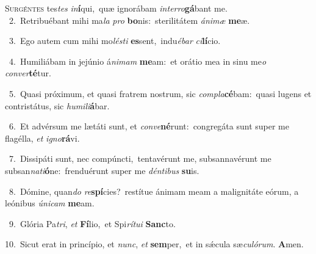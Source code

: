 \lettrine{\initial\textcolor{\initialcolor}{S}}{urgéntes} tes\textit{tes} \textit{in}\-\textbf{í}qui,~\star quæ ignorábam \textit{in}\-\textit{ter}\textit{ro}\textbf{gá}bant me.\\
{\numbfont\textcolor{\numbcolor}{~2.}}~Retribuébant mihi ma\textit{la} \textit{pro} \textbf{bo}\-nis:~\star sterilitátem \textit{á}\-\textit{ni}\textit{mæ} \textbf{me}\-æ.\par
{\numbfont\textcolor{\numbcolor}{~3.}}~Ego autem cum mihi mo\-\textit{lés}\-\textit{ti} \textbf{es}\-sent,~\star indu\-\textit{é}\-\textit{bar} \textit{ci}\-\textbf{lí}cio.\par
{\numbfont\textcolor{\numbcolor}{~4.}}~Humiliábam in jejúnio á\-\textit{ni}\-\textit{mam} \textbf{me}\-am:~\star et orátio mea in sinu me\textit{o} \textit{con}\-\textit{ver}\textbf{té}tur.\par
{\numbfont\textcolor{\numbcolor}{~5.}}~Quasi próximum, et quasi fratrem nostrum, sic \textit{com}\-\textit{pla}\textbf{cé}bam:~\star quasi lugens et contristátus, sic \textit{hu}\-\textit{mi}\textit{li}\textbf{á}bar.\par
{\numbfont\textcolor{\numbcolor}{~6.}}~Et advérsum me lætáti sunt, et \textit{con}\-\textit{ve}\textbf{né}runt:~\star congregáta sunt super me flagélla, \textit{et} \textit{i}\-\textit{gno}\textbf{rá}vi.\par
{\numbfont\textcolor{\numbcolor}{~7.}}~Dissipáti sunt, nec compúncti,~\dagger tentavérunt me, subsannavérunt me subsan\-\textit{na}\-\textit{ti}\textbf{ó}ne:~\star frenduérunt super me \textit{dén}\-\textit{ti}\textit{bus} \textbf{su}\-is.\par
{\numbfont\textcolor{\numbcolor}{~8.}}~Dómine, quan\textit{do} \textit{re}\-\textbf{spí}cies?~\star restítue ánimam meam a malignitáte eórum, a leónibus \textit{ú}\-\textit{ni}\textit{cam} \textbf{me}\-am.\par
{\numbfont\textcolor{\numbcolor}{~9.}}~Glória Pa\-\textit{tri}\-, \textit{et} \textbf{Fí}\-lio,~\star et Spi\-\textit{rí}\-\textit{tu}\textit{i} \textbf{Sanc}\-to.\par
{\numbfont\textcolor{\numbcolor}{10.}}~Sicut erat in princípio, et \textit{nunc}\-, \textit{et} \textbf{sem}\-per,~\star et in sǽcula sæ\-\textit{cu}\-\textit{ló}\textit{rum}. \textbf{A}\-men.\par
